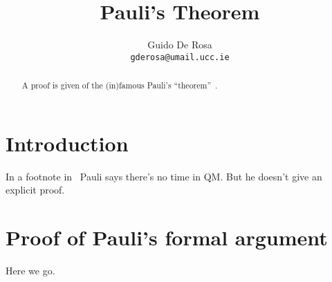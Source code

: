 \documentclass[a4paper,12pt]{article}
\author{Guido De Rosa \\ \small\tt{gderosa@umail.ucc.ie}}
\title{Pauli's Theorem}
\begin{document}
\maketitle
\begin{abstract}
A proof is given of the (in)famous Pauli's ``theorem''~\cite[footnote~2]{PauliFootnote}.
\end{abstract}
\section{Introduction}
In a footnote in~\cite{PauliFootnote} Pauli says there's no time in QM. But he
doesn't give an explicit proof.

\section{Proof of Pauli's formal argument}\label{proof}
Here we go.



\end{document}
